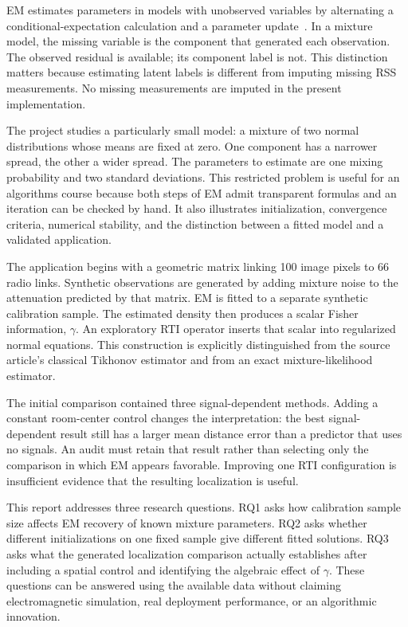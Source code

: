 \documentclass[conference,letterpaper]{IEEEtran}
\begin{document}
EM estimates parameters in models with unobserved variables by alternating a conditional-expectation calculation and a parameter update~\cite{dempster1977}. In a mixture model, the missing variable is the component that generated each observation. The observed residual is available; its component label is not. This distinction matters because estimating latent labels is different from imputing missing RSS measurements. No missing measurements are imputed in the present implementation.

The project studies a particularly small model: a mixture of two normal distributions whose means are fixed at zero. One component has a narrower spread, the other a wider spread. The parameters to estimate are one mixing probability and two standard deviations. This restricted problem is useful for an algorithms course because both steps of EM admit transparent formulas and an iteration can be checked by hand. It also illustrates initialization, convergence criteria, numerical stability, and the distinction between a fitted model and a validated application.

The application begins with a geometric matrix linking 100 image pixels to 66 radio links. Synthetic observations are generated by adding mixture noise to the attenuation predicted by that matrix. EM is fitted to a separate synthetic calibration sample. The estimated density then produces a scalar Fisher information, $\gamma$. An exploratory RTI operator inserts that scalar into regularized normal equations. This construction is explicitly distinguished from the source article's classical Tikhonov estimator and from an exact mixture-likelihood estimator.

The initial comparison contained three signal-dependent methods. Adding a constant room-center control changes the interpretation: the best signal-dependent result still has a larger mean distance error than a predictor that uses no signals. An audit must retain that result rather than selecting only the comparison in which EM appears favorable. Improving one RTI configuration is insufficient evidence that the resulting localization is useful.

This report addresses three research questions. RQ1 asks how calibration sample size affects EM recovery of known mixture parameters. RQ2 asks whether different initializations on one fixed sample give different fitted solutions. RQ3 asks what the generated localization comparison actually establishes after including a spatial control and identifying the algebraic effect of $\gamma$. These questions can be answered using the available data without claiming electromagnetic simulation, real deployment performance, or an algorithmic innovation.
\end{document}
